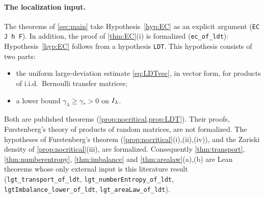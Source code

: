 \paragraph{The localization input.}  The theorems of \cref{sec:main} take Hypothesis~\ref{hyp:EC} as
an explicit argument (\texttt{EC J h F}).  In addition, the proof of \cref{thm:EC}(i) is formalized
(\texttt{ec\_of\_ldt}): Hypothesis~\ref{hyp:EC} follows from a hypothesis \texttt{LDT}.  This
hypothesis consists of two parts:
\begin{itemize}
\item the uniform large-deviation estimate \eqref{eq:LDTvec}, in vector form, for products of
i.i.d.\ Bernoulli transfer matrices;
\item a lower bound $\gamma_\lambda\ge\gamma_*>0$ on $I_\lambda$.
\end{itemize}
Both are published theorems (\cref{prop:nocritical,prop:LDT}).  Their proofs, Furstenberg's theory
of products of random matrices, are not formalized.  The hypotheses of Furstenberg's theorem
(\cref{prop:nocritical}(i),(ii),(iv)), and the Zariski density of \cref{prop:nocritical}(iii), are formalized.  Consequently \cref{thm:transport},
\cref{thm:numberentropy}, \cref{thm:imbalance} and \cref{thm:arealaw}(a),(b) are Lean theorems whose
only external input is this literature result (\texttt{lgt\_transport\_of\_ldt},
\texttt{lgt\_numberEntropy\_of\_ldt}, \texttt{lgtImbalance\_lower\_of\_ldt}, \texttt{lgt\_areaLaw\_of\_ldt}).

